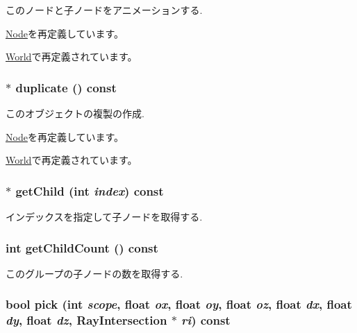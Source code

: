 このノードと子ノードをアニメーションする. 

\hyperlink{classm3g_1_1Node_8aad1ceab4c2a03609c8a42324ce484d}{Node}を再定義しています。

\hyperlink{classm3g_1_1World_8aad1ceab4c2a03609c8a42324ce484d}{World}で再定義されています。\hypertarget{classm3g_1_1Group_1212dbd493e73180a6204874bd97df6b}{
\subsubsection[{duplicate}]{ $\ast$ duplicate () const}}
\label{classm3g_1_1Group_1212dbd493e73180a6204874bd97df6b}


このオブジェクトの複製の作成. 

\hyperlink{classm3g_1_1Node_0b9f7531a4b56d34f47aeb1fff0d37e0}{Node}を再定義しています。

\hyperlink{classm3g_1_1World_efde97aaf753d48fff769d9011f187f2}{World}で再定義されています。\hypertarget{classm3g_1_1Group_a3af7d07fde341ef751157d274538698}{
\subsubsection[{getChild}]{ $\ast$ getChild (int {\em index}) const}}
\label{classm3g_1_1Group_a3af7d07fde341ef751157d274538698}


インデックスを指定して子ノードを取得する. \hypertarget{classm3g_1_1Group_756d01dca16e146d69bb1881aca8fbb7}{
\subsubsection[{getChildCount}]{\setlength{\rightskip}{0pt plus 5cm}int getChildCount () const}}
\label{classm3g_1_1Group_756d01dca16e146d69bb1881aca8fbb7}


このグループの子ノードの数を取得する. \hypertarget{classm3g_1_1Group_10a3c77fa36fdb5d09b2bf39fe2a7c0b}{
\subsubsection[{pick}]{\setlength{\rightskip}{0pt plus 5cm}bool pick (int {\em scope}, \/  float {\em ox}, \/  float {\em oy}, \/  float {\em oz}, \/  float {\em dx}, \/  float {\em dy}, \/  float {\em dz}, \/  {\bf RayIntersection} $\ast$ {\em ri}) const}}
\label{classm3g_1_1Group_10a3c77fa36fdb5d09b2bf39fe2a7c0b}


